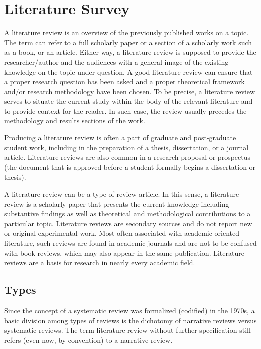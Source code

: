 

\chapter{Literature Survey}
A literature review is an overview of the previously published works on a topic. The term can refer to a full scholarly paper or a section of a scholarly work such as a book, or an article. Either way, a literature review is supposed to provide the researcher/author and the audiences with a general image of the existing knowledge on the topic under question. A good literature review can ensure that a proper research question has been asked and a proper theoretical framework and/or research methodology have been chosen. To be precise, a literature review serves to situate the current study within the body of the relevant literature and to provide context for the reader. In such case, the review usually precedes the methodology and results sections of the work.

Producing a literature review is often a part of graduate and post-graduate student work, including in the preparation of a thesis, dissertation, or a journal article. Literature reviews are also common in a research proposal or prospectus (the document that is approved before a student formally begins a dissertation or thesis).

A literature review can be a type of review article. In this sense, a literature review is a scholarly paper that presents the current knowledge including substantive findings as well as theoretical and methodological contributions to a particular topic. Literature reviews are secondary sources and do not report new or original experimental work. Most often associated with academic-oriented literature, such reviews are found in academic journals and are not to be confused with book reviews, which may also appear in the same publication. Literature reviews are a basis for research in nearly every academic field.

\section{Types}

Since the concept of a systematic review was formalized (codified) in the 1970s, a basic division among types of reviews is the dichotomy of narrative reviews versus systematic reviews. The term literature review without further specification still refers (even now, by convention) to a narrative review.

